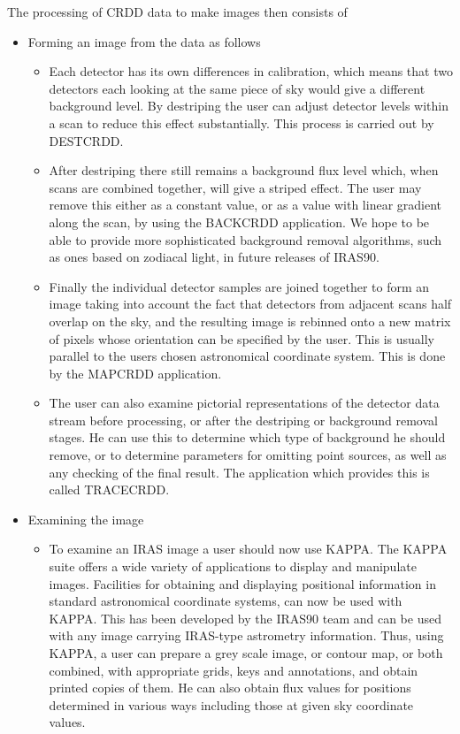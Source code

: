 \documentclass[twoside,11pt]{starlink}
\begin{document}
The processing of CRDD data to make images then consists of
\begin{itemize}
\item Forming an image from the data as follows
\begin{itemize}
\item Each detector has its own differences in calibration, which means that
two detectors each looking at the same piece of sky would give a different
background level. By destriping the user can adjust detector levels within a
scan to reduce this effect substantially. This process is carried out by
DESTCRDD.
\item After destriping there  still remains a background flux level which, when
scans are combined together, will give a striped effect. The user may remove
this either as a constant value, or as a value with linear gradient along the
scan, by using the BACKCRDD application. We hope to be able to provide more
sophisticated background removal algorithms, such as ones based on zodiacal
light, in future releases of IRAS90.
\item Finally the individual detector samples are joined together to form an
image taking into account the fact that detectors from adjacent scans half
overlap on the sky, and the resulting image is rebinned onto a new matrix of
pixels whose orientation can be specified by the user. This is usually parallel
to the users chosen astronomical coordinate system. This is done by the MAPCRDD
application.
\item The user can also examine pictorial representations of the detector data
stream before processing, or after the destriping or background removal stages.
He can use this to determine which type of background he should remove, or to
determine parameters for omitting point sources, as well as any checking of
the final result. The application which provides this is called TRACECRDD.
\end{itemize}
\item Examining the image
\begin{itemize}
\item To examine an IRAS image a user  should now use KAPPA. The KAPPA suite
offers a wide variety of applications to display and manipulate images.
Facilities for obtaining and displaying positional information in standard
astronomical coordinate systems, can now be used with KAPPA. This has been
developed by the IRAS90 team  and can be used with any image carrying IRAS-type
astrometry information.
Thus, using KAPPA, a user can prepare a grey scale image, or contour map, or
both combined, with appropriate grids, keys and annotations, and obtain printed
copies of them. He can also obtain flux values for positions determined in
various  ways including those at given sky coordinate values.
\end{itemize}
\end{itemize}
\end{document}
